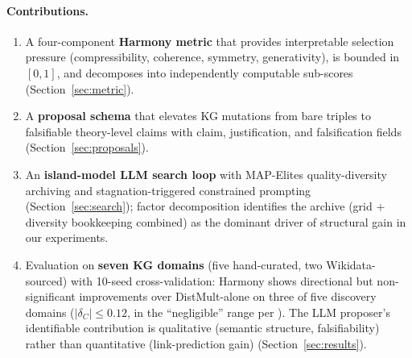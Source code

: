 \paragraph{Contributions.}
\begin{enumerate}[nosep]
  \item A four-component \textbf{Harmony metric} that provides interpretable
    selection pressure (compressibility, coherence, symmetry, generativity),
    is bounded in $[0,1]$, and decomposes into independently computable
    sub-scores (Section~\ref{sec:metric}).
  \item A \textbf{proposal schema} that elevates KG mutations from bare triples
    to falsifiable theory-level claims with claim, justification, and
    falsification fields (Section~\ref{sec:proposals}).
  \item An \textbf{island-model LLM search loop} with MAP-Elites quality-diversity
    archiving and stagnation-triggered constrained prompting
    (Section~\ref{sec:search}); factor decomposition identifies the
    archive (grid + diversity bookkeeping combined) as the dominant driver of
    structural gain in our experiments.
  \item Evaluation on \textbf{seven KG domains} (five hand-curated, two
    Wikidata-sourced) with 10-seed cross-validation: Harmony shows
    directional but non-significant improvements over DistMult-alone on
    three of five discovery domains
    ($|\delta_C| \leq 0.12$, in the ``negligible'' range per
    \citet{cliff1993dominance}).  The LLM proposer's identifiable
    contribution is qualitative (semantic structure, falsifiability)
    rather than quantitative (link-prediction gain) (Section~\ref{sec:results}).
\end{enumerate}
